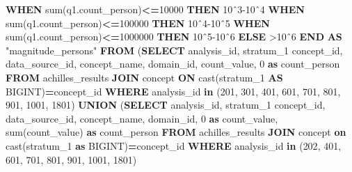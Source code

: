 \documentclass[
]{book}
\newenvironment{Shaded}{\begin{snugshade}}{\end{snugshade}}
\newcommand{\ControlFlowTok}[1]{\textcolor[rgb]{0.13,0.29,0.53}{\textbf{#1}}}
\newcommand{\DecValTok}[1]{\textcolor[rgb]{0.00,0.00,0.81}{#1}}
\newcommand{\FunctionTok}[1]{\textcolor[rgb]{0.00,0.00,0.00}{#1}}
\newcommand{\KeywordTok}[1]{\textcolor[rgb]{0.13,0.29,0.53}{\textbf{#1}}}
\newcommand{\NormalTok}[1]{#1}
\newcommand{\OperatorTok}[1]{\textcolor[rgb]{0.81,0.36,0.00}{\textbf{#1}}}
\newcommand{\OtherTok}[1]{\textcolor[rgb]{0.56,0.35,0.01}{#1}}
\newcommand{\StringTok}[1]{\textcolor[rgb]{0.31,0.60,0.02}{#1}}
\begin{document}
\begin{Shaded}
\begin{Highlighting}[]
        \ControlFlowTok{WHEN} \FunctionTok{sum}\NormalTok{(q1.count\_person)}\OperatorTok{\textless{}=}\DecValTok{10000} \ControlFlowTok{THEN} \StringTok{\textquotesingle{}10ˆ3{-}10ˆ4\textquotesingle{}}
        \ControlFlowTok{WHEN} \FunctionTok{sum}\NormalTok{(q1.count\_person)}\OperatorTok{\textless{}=}\DecValTok{100000} \ControlFlowTok{THEN} \StringTok{\textquotesingle{}10ˆ4{-}10ˆ5\textquotesingle{}}
        \ControlFlowTok{WHEN} \FunctionTok{sum}\NormalTok{(q1.count\_person)}\OperatorTok{\textless{}=}\DecValTok{1000000} \ControlFlowTok{THEN} \StringTok{\textquotesingle{}10ˆ5{-}10ˆ6\textquotesingle{}}
        \ControlFlowTok{ELSE} \StringTok{\textquotesingle{}\textgreater{}10ˆ6\textquotesingle{}}
    \ControlFlowTok{END} \KeywordTok{AS} \OtherTok{"magnitude\_persons"}
\KeywordTok{FROM}\NormalTok{ (}\KeywordTok{SELECT}\NormalTok{ analysis\_id,}
\NormalTok{             stratum\_1 concept\_id,}
\NormalTok{             data\_source\_id,}
\NormalTok{             concept\_name,}
\NormalTok{             domain\_id,}
\NormalTok{             count\_value, }\DecValTok{0} \KeywordTok{as}\NormalTok{ count\_person}
    \KeywordTok{FROM}\NormalTok{ achilles\_results}
    \KeywordTok{JOIN}\NormalTok{ concept }\KeywordTok{ON} \FunctionTok{cast}\NormalTok{(stratum\_1 }\KeywordTok{AS}\NormalTok{ BIGINT)}\OperatorTok{=}\NormalTok{concept\_id}
    \KeywordTok{WHERE}\NormalTok{ analysis\_id }\KeywordTok{in}\NormalTok{ (}\DecValTok{201}\NormalTok{, }\DecValTok{301}\NormalTok{, }\DecValTok{401}\NormalTok{, }\DecValTok{601}\NormalTok{, }\DecValTok{701}\NormalTok{, }\DecValTok{801}\NormalTok{, }\DecValTok{901}\NormalTok{, }\DecValTok{1001}\NormalTok{, }\DecValTok{1801}\NormalTok{)}
    \KeywordTok{UNION}\NormalTok{ (}\KeywordTok{SELECT}\NormalTok{  analysis\_id,}
\NormalTok{                   stratum\_1 concept\_id,}
\NormalTok{                   data\_source\_id,}
\NormalTok{                   concept\_name,}
\NormalTok{                   domain\_id,}
                   \DecValTok{0} \KeywordTok{as}\NormalTok{ count\_value,}
                   \FunctionTok{sum}\NormalTok{(count\_value) }\KeywordTok{as}\NormalTok{ count\_person}
            \KeywordTok{FROM}\NormalTok{  achilles\_results}
            \KeywordTok{JOIN}\NormalTok{ concept }\KeywordTok{on} \FunctionTok{cast}\NormalTok{(stratum\_1 }\KeywordTok{as}\NormalTok{ BIGINT)}\OperatorTok{=}\NormalTok{concept\_id}
            \KeywordTok{WHERE}\NormalTok{ analysis\_id }\KeywordTok{in}\NormalTok{ (}\DecValTok{202}\NormalTok{, }\DecValTok{401}\NormalTok{, }\DecValTok{601}\NormalTok{, }\DecValTok{701}\NormalTok{, }\DecValTok{801}\NormalTok{, }\DecValTok{901}\NormalTok{, }\DecValTok{1001}\NormalTok{, }\DecValTok{1801}\NormalTok{)}

\end{Highlighting}
\end{Shaded}
\end{document}
